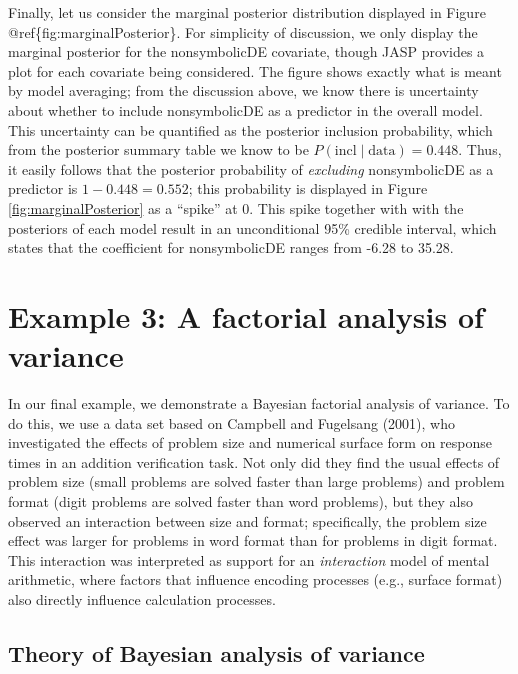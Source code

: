 \documentclass[english,,doc,floatsintext]{apa6}
\begin{document}
Finally, let us consider the marginal posterior distribution displayed in Figure @ref\{fig:marginalPosterior\}. For simplicity of discussion, we only display the marginal posterior for the nonsymbolicDE covariate, though JASP provides a plot for each covariate being considered. The figure shows exactly what is meant by model averaging; from the discussion above, we know there is uncertainty about whether to include nonsymbolicDE as a predictor in the overall model. This uncertainty can be quantified as the posterior inclusion probability, which from the posterior summary table we know to be \(P(\text{incl}\mid \text{data}) = 0.448\). Thus, it easily follows that the posterior probability of \emph{excluding} nonsymbolicDE as a predictor is \(1-0.448 = 0.552\); this probability is displayed in Figure \ref{fig:marginalPosterior} as a \enquote{spike} at 0. This spike together with with the posteriors of each model result in an unconditional 95\% credible interval, which states that the coefficient for nonsymbolicDE ranges from -6.28 to 35.28.

\hypertarget{example-3-a-factorial-analysis-of-variance}{%
\section{Example 3: A factorial analysis of variance}\label{example-3-a-factorial-analysis-of-variance}}

In our final example, we demonstrate a Bayesian factorial analysis of variance. To do this, we use a data set based on Campbell and Fugelsang (2001), who investigated the effects of problem size and numerical surface form on response times in an addition verification task. Not only did they find the usual effects of problem size (small problems are solved faster than large problems) and problem format (digit problems are solved faster than word problems), but they also observed an interaction between size and format; specifically, the problem size effect was larger for problems in word format than for problems in digit format. This interaction was interpreted as support for an \emph{interaction} model of mental arithmetic, where factors that influence encoding processes (e.g., surface format) also directly influence calculation processes.

\hypertarget{theory-of-bayesian-analysis-of-variance}{%
\subsection{Theory of Bayesian analysis of variance}\label{theory-of-bayesian-analysis-of-variance}}
\end{document}
